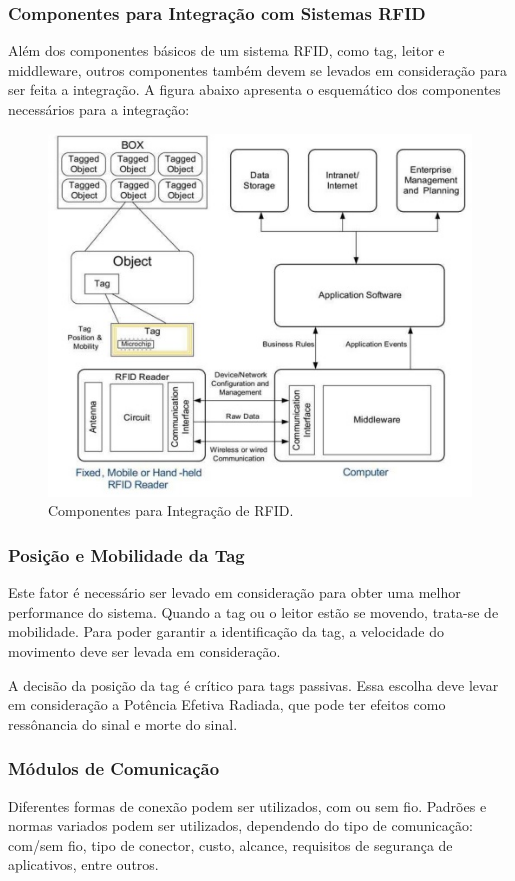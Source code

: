 \subsubsection{Componentes para Integração com Sistemas RFID}
Além dos componentes básicos de um sistema RFID, como tag, leitor e middleware, outros componentes também devem se levados em consideração para ser feita a integração. A figura abaixo apresenta o esquemático dos componentes necessários para a integração:


\begin{figure}[h!]
	\centering
		\includegraphics[width=0.5\linewidth]{componente integracao.jpg}
	\caption{Componentes para Integração de RFID.}
	\label{fig:componente integracao}
\end{figure}


\subsubsection{Posição e Mobilidade da Tag}
Este fator é necessário ser levado em consideração para obter uma melhor performance do sistema. Quando a tag ou o leitor estão se movendo, trata-se de mobilidade. Para poder garantir a identificação da tag, a velocidade do movimento deve ser levada em consideração.
		
		A decisão da posição da tag é crítico para tags passivas. Essa escolha deve levar em consideração a Potência Efetiva Radiada, que pode ter efeitos como ressônancia do sinal e morte do sinal.
		
		
\subsubsection{Módulos de Comunicação}
Diferentes formas de conexão podem ser utilizados, com ou sem fio. Padrões e normas variados podem ser utilizados, dependendo  do tipo de comunicação: com/sem fio, tipo de conector, custo, alcance, requisitos de segurança de aplicativos, entre outros.


